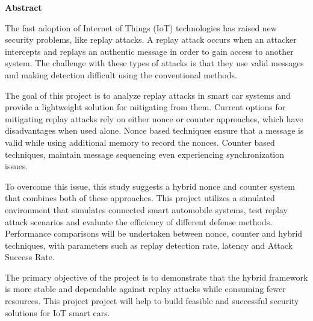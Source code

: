 \documentclass[a4paper,man,12pt]{article}
\begin{document}




\newpage

\begin{center}
    \vspace*{2cm}
    
    \textbf{\Large Abstract}
\end{center}



The fast adoption of Internet of Things (IoT) technologies has raised new security problems, like replay attacks. A replay attack occurs when an attacker intercepts and replays an authentic message in order to gain access to another system. The challenge with these types of attacks is that they use valid messages and making detection difficult using the conventional methods.\bigbreak

The goal of this project is to analyze replay attacks in smart car systems and provide a lightweight solution for mitigating from them. Current options for mitigating replay attacks rely on either nonce or counter approaches, which have disadvantages when used alone. Nonce based techniques ensure that a message is valid while using additional memory to record the nonces. Counter based techniques, maintain message sequencing even experiencing synchronization issues.\bigbreak

To overcome this issue, this study suggests a hybrid nonce and counter system that combines both of these approaches. This project utilizes a simulated environment that simulates connected smart automobile systems, test replay attack scenarios and evaluate the efficiency of different defense methods. Performance comparisons will be undertaken between nonce, counter and hybrid techniques, with parameters such as replay detection rate, latency and Attack Success Rate.\bigbreak

The primary objective of the project is to demonstrate that the hybrid framework is more stable and dependable against replay attacks while consuming fewer resources. This project project will help to build feasible and successful security solutions for IoT smart cars.
\end{document}
